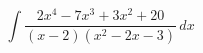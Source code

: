 \documentclass[../rgr1.tex]{subfiles}
\begin{document}
\Solution

\begin{equation}
	\int \frac{ 2x^4 - 7x^3 + 3x^2 + 20 }{ (x-2)(x^2 - 2x - 3) } \, dx
\end{equation}

\Answer{
	<++>
}
\end{document}

